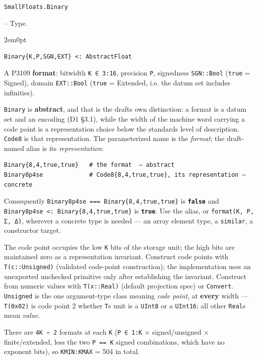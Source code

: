 \par\medskip\noindent\begin{minipage}{\linewidth}
\hypertarget{10793991096487538164}{\texttt{SmallFloats.Binary}}  -- {Type.}
\nopagebreak
\begin{adjustwidth}{2em}{0pt}


\begin{verbatim}
Binary{K,P,SGN,EXT} <: AbstractFloat
\end{verbatim}

A P3109 \textbf{format}: bitwidth \texttt{K ∈ 3:16}, precision \texttt{P}, signedness \texttt{SGN::Bool} (\texttt{true} = Signed), domain \texttt{EXT::Bool} (\texttt{true} = Extended, i.e. the datum set includes infinities).

\texttt{Binary} is \textbf{abstract}, and that is the draft{\textquotesingle}s own distinction: a format is {\textquotedbl}a datum set and an encoding{\textquotedbl} (D1 §3.1), while the width of the machine word carrying a code point is a representation choice below the standard{\textquotesingle}s level of description. \texttt{Code8} is that representation. The parameterized name is the \emph{format}; the draft-named alias is its \emph{representation}:


\nopagebreak[4]
\begin{verbatim}
Binary{8,4,true,true}   # the format  — abstract
Binary8p4se             # Code8{8,4,true,true}, its representation — concrete
\end{verbatim}

Consequently \texttt{Binary8p4se === Binary\{8,4,true,true\}} is \textbf{\texttt{false}} and \texttt{Binary8p4se <: Binary\{8,4,true,true\}} is \textbf{\texttt{true}}. Use the alias, or \texttt{format(K, P, Σ, Δ)}, wherever a concrete type is needed — an array element type, a \texttt{similar}, a constructor target.

The code point occupies the low \texttt{K} bits of the storage unit; the high bits are maintained zero as a representation invariant. Construct code points with \texttt{T(c::Unsigned)} (validated code-point construction); the implementation uses an unexported unchecked primitive only after establishing the invariant. Construct from numeric values with \texttt{T(x::Real)} (default projection spec) or \texttt{Convert}. \texttt{Unsigned} is the one argument-type class meaning \emph{code point}, at \textbf{every} width — \texttt{T(0x02)} is code point 2 whether \texttt{T}{\textquotesingle}s unit is a \texttt{UInt8} or a \texttt{UInt16}; all other \texttt{Real}s mean \emph{value}.

There are \texttt{4K − 2} formats at each \texttt{K} (\texttt{P ∈ 1:K} × signed/unsigned × finite/extended, less the two \texttt{P == K} signed combinations, which have no exponent bits), so \texttt{KMIN:KMAX} = 504 in total.



\end{adjustwidth}
\end{minipage}
\par\medskip

